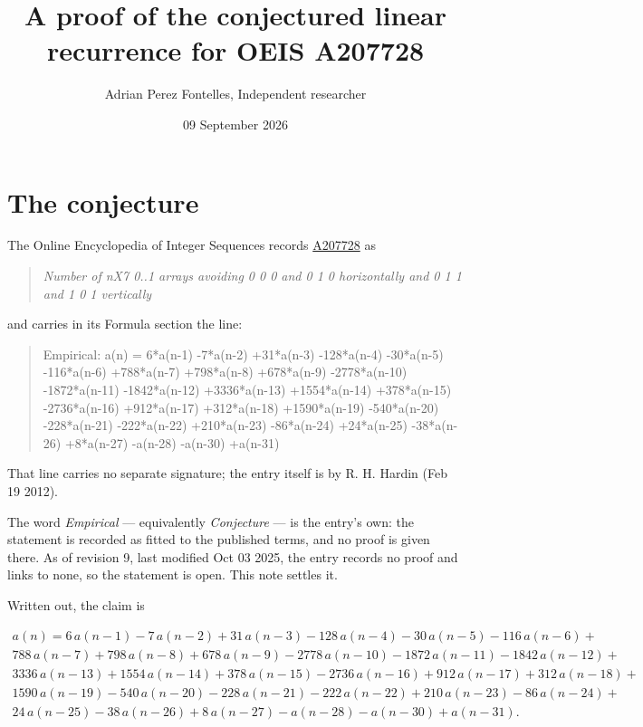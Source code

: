 \documentclass[11pt]{article}
\title{A proof of the conjectured linear recurrence for OEIS A207728}
\author{Adrian Perez Fontelles, Independent researcher}
\date{09 September 2026}
\theoremstyle{definition}
\begin{document}
\maketitle
\section{The conjecture}

The Online Encyclopedia of Integer Sequences records \href{https://oeis.org/A207728}{A207728} as

\begin{quote}\itshape Number of nX7 0..1 arrays avoiding 0 0 0 and 0 1 0 horizontally and 0 1 1 and 1 0 1 vertically\end{quote}

and carries in its Formula section the line:

\begin{quote}\ttfamily Empirical: a(n) = 6*a(n-1) -7*a(n-2) +31*a(n-3) -128*a(n-4) -30*a(n-5) -116*a(n-6) +788*a(n-7) +798*a(n-8) +678*a(n-9) -2778*a(n-10) -1872*a(n-11) -1842*a(n-12) +3336*a(n-13) +1554*a(n-14) +378*a(n-15) -2736*a(n-16) +912*a(n-17) +312*a(n-18) +1590*a(n-19) -540*a(n-20) -228*a(n-21) -222*a(n-22) +210*a(n-23) -86*a(n-24) +24*a(n-25) -38*a(n-26) +8*a(n-27) -a(n-28) -a(n-30) +a(n-31)\end{quote}

That line carries no separate signature; the entry itself is by R. H. Hardin (Feb 19 2012).

The word {\itshape Empirical} --- equivalently {\itshape Conjecture} --- is the entry's own: the statement is recorded as fitted to the published terms, and no proof is given there. As of revision 9, last modified Oct 03 2025, the entry records no proof and links to none, so the statement is open. This note settles it.

Written out, the claim is

\begin{multline*} a(n) = 6\,a(n-1) - 7\,a(n-2) + 31\,a(n-3) - 128\,a(n-4) - 30\,a(n-5) - 116\,a(n-6) + \\ 788\,a(n-7) + 798\,a(n-8) + 678\,a(n-9) - 2778\,a(n-10) - 1872\,a(n-11) - 1842\,a(n-12) + \\ 3336\,a(n-13) + 1554\,a(n-14) + 378\,a(n-15) - 2736\,a(n-16) + 912\,a(n-17) + 312\,a(n-18) + \\ 1590\,a(n-19) - 540\,a(n-20) - 228\,a(n-21) - 222\,a(n-22) + 210\,a(n-23) - 86\,a(n-24) + \\ 24\,a(n-25) - 38\,a(n-26) + 8\,a(n-27) - a(n-28) - a(n-30) + a(n-31). \end{multline*}
\end{document}
